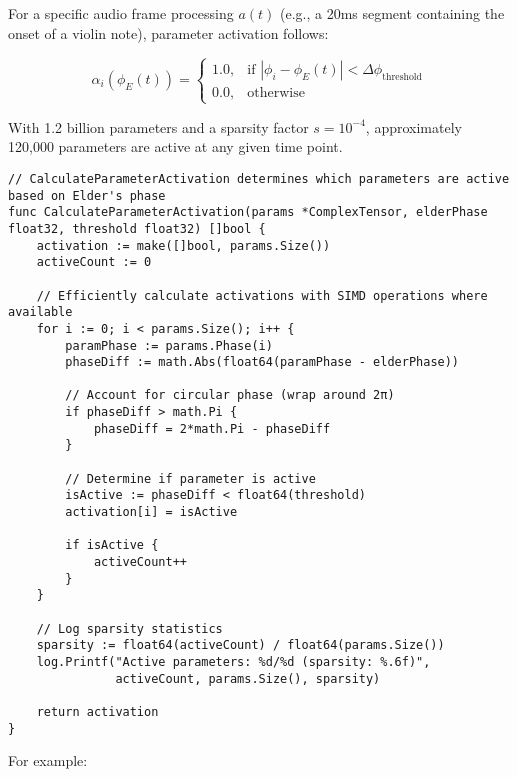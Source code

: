 For a specific audio frame processing $a(t)$ (e.g., a 20ms segment containing the onset of a violin note), parameter activation follows:

\begin{equation}
\alpha_i(\phi_E(t)) = \begin{cases}
1.0, & \text{if } |\phi_i - \phi_E(t)| < \Delta\phi_{\text{threshold}} \\
0.0, & \text{otherwise}
\end{cases}
\end{equation}

With 1.2 billion parameters and a sparsity factor $s = 10^{-4}$, approximately 120,000 parameters are active at any given time point. 

\begin{tcolorbox}[colback=CodeBackground, colframe=DarkGray, title=Parameter Activation Function in Go, fonttitle=\bfseries]
\begin{verbatim}
// CalculateParameterActivation determines which parameters are active based on Elder's phase
func CalculateParameterActivation(params *ComplexTensor, elderPhase float32, threshold float32) []bool {
    activation := make([]bool, params.Size())
    activeCount := 0
    
    // Efficiently calculate activations with SIMD operations where available
    for i := 0; i < params.Size(); i++ {
        paramPhase := params.Phase(i)
        phaseDiff := math.Abs(float64(paramPhase - elderPhase))
        
        // Account for circular phase (wrap around 2π)
        if phaseDiff > math.Pi {
            phaseDiff = 2*math.Pi - phaseDiff
        }
        
        // Determine if parameter is active
        isActive := phaseDiff < float64(threshold)
        activation[i] = isActive
        
        if isActive {
            activeCount++
        }
    }
    
    // Log sparsity statistics
    sparsity := float64(activeCount) / float64(params.Size())
    log.Printf("Active parameters: %d/%d (sparsity: %.6f)", 
               activeCount, params.Size(), sparsity)
    
    return activation
}
\end{verbatim}
\end{tcolorbox}

For example:

